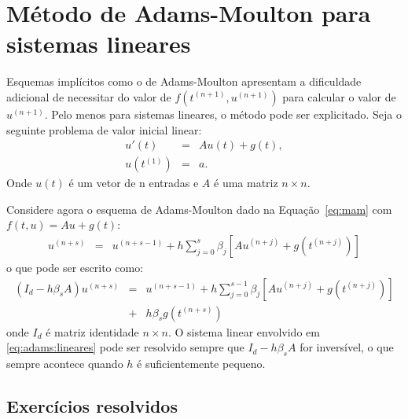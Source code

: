 %
%
%

\section{Método de Adams-Moulton para sistemas lineares}
Esquemas implícitos como o de Adams-Moulton apresentam a dificuldade adicional de necessitar do valor de $f(t^{(n+1)},u^{(n+1)})$ para calcular o valor de $u^{(n+1)}$. Pelo menos para sistemas lineares, o método pode ser explicitado. Seja o seguinte problema de valor inicial linear:
\begin{eqnarray}
 u'(t)&=& Au(t) + g(t),\\
 u(t^{(1)}) &=& a.
\end{eqnarray}
Onde $u(t)$ é um vetor de n entradas e $A$ é uma matriz $n\times n$.

Considere agora o esquema de Adams-Moulton dado na Equação~\eqref{eq:mam} com $f(t,u)=Au+g(t)$:
\begin{eqnarray}
  u^{(n+s)}  &=& u^{(n+s-1)}  + h\sum_{j=0}^{s}\beta_j \left[Au^{(n+j)} + g(t^{(n+j)})\right]
\end{eqnarray}
o que pode ser escrito como:
\begin{eqnarray}
  \left(I_d-h\beta_s A\right)u^{(n+s)}  &=& u^{(n+s-1)}  + h\sum_{j=0}^{s-1}\beta_j \left[Au^{(n+j)}+ g(t^{(n+j)})\right]\nonumber\\
  &+& h\beta_s g(t^{(n+s)}) \label{eq:adams:lineares}
\end{eqnarray}
onde $I_d$ é matriz identidade $n\times n$. O sistema linear envolvido em \eqref{eq:adams:lineares} pode ser resolvido sempre que $I_d-h\beta_s A$ for inversível, o que sempre acontece quando $h$ é suficientemente pequeno.

\subsection*{Exercícios resolvidos}

